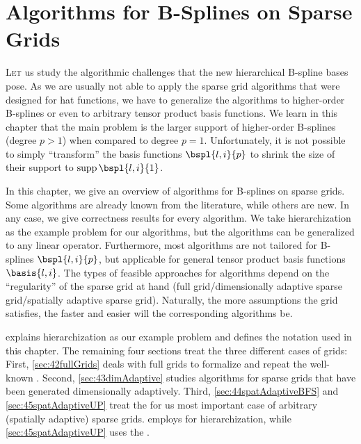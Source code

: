 
\chapter{Algorithms for B-Splines on Sparse Grids}


\lettrine{L}{et}
us study the algorithmic challenges that the new hierarchical B-spline
bases pose.
As we are usually not able to apply the sparse grid algorithms
that were designed for hat functions, we have to generalize the algorithms
to higher-order B-splines or even to arbitrary tensor product basis functions.
We learn in this chapter that the main problem is the larger support
of higher-order B-splines (degree $p > 1$) when compared to degree $p = 1$.
Unfortunately, it is not possible to simply ``transform'' the basis
functions $\bspl{l,i}{p}$ to shrink the size of their support
to $\supp \bspl{l,i}{1}$.

In this chapter, we give an overview of algorithms for B-splines
on sparse grids.
Some algorithms are already known from the literature,
while others are new.
In any case, we give correctness results for every algorithm.
We take hierarchization as the example problem for our algorithms,
but the algorithms can be generalized to any linear operator.
Furthermore, most algorithms are not tailored for B-splines $\bspl{l,i}{p}$,
but applicable for general tensor product basis functions $\basis{l,i}$.
The types of feasible approaches for algorithms
depend on the ``regularity'' of the sparse grid at hand
(full grid/dimensionally adaptive sparse grid/spatially adaptive sparse grid).
Naturally, the more assumptions the grid satisfies, the faster and
easier will the corresponding algorithms be.

 explains hierarchization as our example problem
and defines the notation used in this chapter.
The remaining four sections treat the three different cases of grids:
First, \cref{sec:42fullGrids} deals with full grids to formalize and repeat
the well-known \up.
Second, \cref{sec:43dimAdaptive} studies algorithms for
sparse grids that have been generated dimensionally adaptively.
Third, \cref{sec:44spatAdaptiveBFS} and \cref{sec:45spatAdaptiveUP}
treat the for us most important case
of arbitrary (spatially adaptive) sparse grids.
 employs \bfs for hierarchization,
while \cref{sec:45spatAdaptiveUP} uses the \up.

